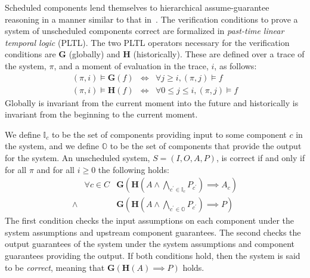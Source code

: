 
\newcommand{\globally}{\ensuremath{\mathbf{G}}}
\newcommand{\historically}{\ensuremath{\mathbf{H}}}
\newcommand{\assumes}{\ensuremath{A}}
\newcommand{\guarantees}{\ensuremath{P}}
\newcommand{\dispatch}{\ensuremath{\mathit{dispatch}}}
\newcommand{\complete}{\ensuremath{\mathit{complete}}}
\newcommand{\same}[1]{\ensuremath{\mathit{same}(#1)}}
\newcommand{\inputs}{\ensuremath{I}}
\newcommand{\outputs}{\ensuremath{O}}
\newcommand{\system}{\ensuremath{S}}
\newcommand{\components}{\ensuremath{C}}
\newcommand{\schedule}{\ensuremath{\phi}}
\newcommand{\valid}{\ensuremath{\mathit{valid}}}
\newcommand{\dpred}{\ensuremath{\delta^\phi}}
\newcommand{\dispred}{\ensuremath{\mathbb{D}^\phi}}
\newcommand{\compred}{\ensuremath{\mathbb{C}^\phi}}
\newcommand{\dispredp}{\ensuremath{\mathbb{D}^{\phi\prime}}}
\newcommand{\compredp}{\ensuremath{\mathbb{C}^{\phi\prime}}}


Scheduled components lend themselves to hierarchical assume-guarantee reasoning in a manner similar to that in~\cite{AGREE2}.
The verification conditions to prove a system of unscheduled components correct are formalized in \emph{past-time linear temporal logic} (PLTL). 
The two PLTL operators necessary for the verification conditions are $\globally$ (globally) and $\historically$ (historically).
These are defined over a trace of the system, $\pi$, and a moment of evaluation in the trace, $i$, as follows:
\begin{eqnarray*}
 (\pi, i) \models \globally(f) & \iff & \forall j \ge i, (\pi, j) \models f \\
(\pi, i) \models \historically(f) & \iff & \forall 0 \le j \le i, (\pi, j) \models f
\end{eqnarray*}
Globally is invariant from the current moment into the future and historically is invariant from the beginning to the current moment.

We define $\mathbb{I}_c$ to be the set of components providing input to some component $c$ in the system, and we define $\mathbb{O}$ to be the set of components that provide the output for the system. An unscheduled system, $\system = (\inputs, \outputs, \assumes, \guarantees)$, is correct if and only if for all $\pi$ and for all $i \ge 0$ the following holds:
\[
\begin{array}{lll}
        & \forall c \in \components &  
            \globally(\historically(\assumes \wedge 
            \bigwedge_{c^\prime \in \mathbb{I}_c} P_{c^\prime}) 
            \implies \assumes_c) \\
 \wedge &   & 
            \globally(\historically(\assumes \wedge 
            \bigwedge_{c^\prime \in \mathbb{O}} \guarantees_{c^\prime}) 
            \implies \guarantees)
\end{array}
\]
The first condition checks the input assumptions on each component under the system assumptions and upstream component guarantees. The second checks the output guarantees of the system under the system assumptions and component guarantees providing the output.  If both conditions hold, then the system is said to be \emph{correct}, meaning that $\globally(\historically(\assumes) \implies \guarantees)$ holds.

